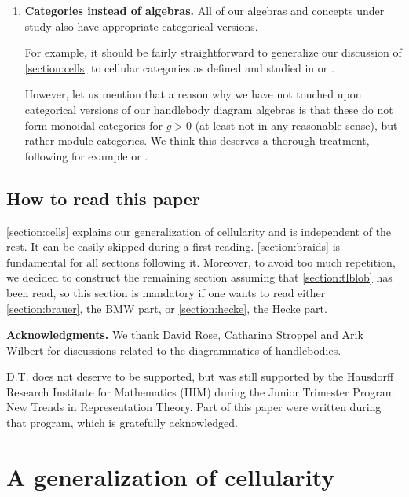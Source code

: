 \documentclass[a4paper,11pt]{amsart}
\numberwithin{equation}{section}
\let\fullref\autoref
\begin{document}
\begin{enumerate}[label=$\bullet$]
\item \textbf{Categories instead of algebras.}
All of our algebras and concepts under study also have appropriate 
categorical versions.

For example, it should be fairly straightforward 
to generalize our discussion of \fullref{section:cells} 
to cellular categories as defined and studied in \cite{We-tensors-cellular-categories} or
\cite{ElLa-trace-hecke}.

However, let us mention that a reason why we have not 
touched upon categorical versions of our handlebody diagram 
algebras is that these do not form monoidal categories 
for $g>0$ (at least not in any reasonable sense), but 
rather module categories. We think this deserves a thorough 
treatment, following for example \cite{HaOl-actions-tensor-categories} 
or \cite{SaTu}.

\end{enumerate}

\subsection{How to read this paper}

\fullref{section:cells} explains our generalization 
of cellularity and is independent of the rest. It can be easily skipped 
during a first reading.
\fullref{section:braids} is fundamental for 
all sections following it. Moreover, to avoid 
too much repetition, we decided to construct the remaining section 
assuming that \fullref{section:tlblob} has been read, so 
this section is mandatory if one wants to read either \fullref{section:brauer}, the BMW part, 
or \fullref{section:hecke}, the Hecke part.

\medskip

\noindent\textbf{Acknowledgments.}
We thank David Rose, Catharina Stroppel and Arik Wilbert for discussions related 
to the diagrammatics of handlebodies.

D.T. does not deserve to be supported, but was still supported
by the Hausdorff Research Institute for Mathematics (HIM) 
during the Junior Trimester Program New Trends in Representation Theory.
Part of this paper were written during that program, which 
is gratefully acknowledged.

\section{A generalization of cellularity}\label{section:cells}
\end{document}
